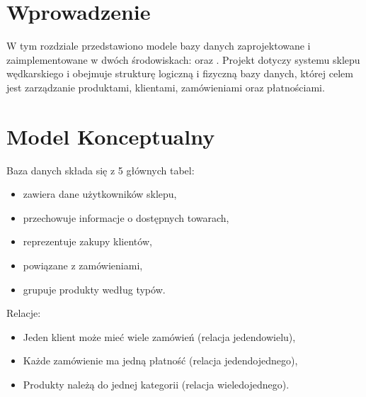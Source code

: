 \documentclass[letterpaper,10pt,english]{sphinxmanual}
\begin{document}
\section{Wprowadzenie}
\label{\detokenize{rozdzial3/index:wprowadzenie}}
\sphinxAtStartPar
W tym rozdziale przedstawiono modele bazy danych zaprojektowane i zaimplementowane w dwóch środowiskach:  oraz . Projekt dotyczy systemu sklepu wędkarskiego i obejmuje strukturę logiczną i fizyczną bazy danych, której celem jest zarządzanie produktami, klientami, zamówieniami oraz płatnościami.


\section{Model Konceptualny}
\label{\detokenize{rozdzial3/index:model-konceptualny}}
\sphinxAtStartPar
Baza danych składa się z 5 głównych tabel:
\begin{itemize}
\item {} 
\sphinxAtStartPar
{} \textendash{} zawiera dane użytkowników sklepu,

\item {} 
\sphinxAtStartPar
{} \textendash{} przechowuje informacje o dostępnych towarach,

\item {} 
\sphinxAtStartPar
{} \textendash{} reprezentuje zakupy klientów,

\item {} 
\sphinxAtStartPar
{} \textendash{} powiązane z zamówieniami,

\item {} 
\sphinxAtStartPar
{} \textendash{} grupuje produkty według typów.

\end{itemize}

\sphinxAtStartPar
Relacje:
\begin{itemize}
\item {} 
\sphinxAtStartPar
Jeden klient może mieć wiele zamówień (relacja jeden\sphinxhyphen{}do\sphinxhyphen{}wielu),

\item {} 
\sphinxAtStartPar
Każde zamówienie ma jedną płatność (relacja jeden\sphinxhyphen{}do\sphinxhyphen{}jednego),

\item {} 
\sphinxAtStartPar
Produkty należą do jednej kategorii (relacja wiele\sphinxhyphen{}do\sphinxhyphen{}jednego).

\end{itemize}
\end{document}

